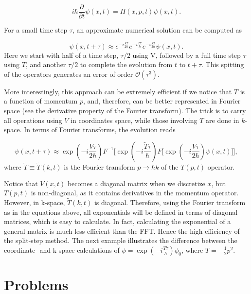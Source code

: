 \begin{equation}
 i\hbar \dfrac{\partial}{\partial t} \psi(x,t) = H(x,p,t)\psi(x,t). 
\end{equation}

For a small time step $\tau$, an approximate numerical solution can be computed as

\begin{equation}
 \psi(x, t+\tau) \approx e^{-i\frac{V\tau}{2\hbar}}  e^{-i\frac{T\tau}{\hbar}}  e^{-i\frac{V\tau}{2\hbar}}\psi(x,t).
\end{equation}
Here we start with half of a time step, $\tau/2$ using V, followed by a full time step $\tau$ using $T$, and another $\tau/2$ to complete the evolution from $t$ to $t+\tau$. This spitting of the operators generates an error of order $\mathcal{O}(\tau^3)$.

More interestingly, this approach can be extremely efficient if we notice that $T$ is a function of momentum $p$, and, therefore, can be better represented in Fourier space (see the derivative property of the Fourier transform). The trick is to carry all operations using $V$ in coordinates space, while those involving $T$ are done in $k$-space. In terms of Fourier transforms, the evolution reads

\begin{equation}
 \psi(x, t+\tau) \approx \exp\left(-i\dfrac{V\tau}{2\hbar}\right) F^{-1}\Big[ \exp\left(-i\dfrac{\tilde{T}\tau}{\hbar}\right)  F\Big[\exp\left(-i\dfrac{V\tau}{2\hbar}\right)  \psi(x,t)\Big]\Big],
\end{equation}
where $\tilde{T} \equiv \tilde{T}(k,t)$ is the Fourier transform $p \rightarrow \hbar k$ of the $T(p,t)$ operator.

Notice that $V(x,t)$ becomes a diagonal matrix when we discretize $x$, but $T(p,t)$ is non-diagonal, as it contains derivatives in the momentum operator. However, in k-space, $\tilde{T}(k,t)$ is diagonal. Therefore, using the Fourier transform as in the equations above, all exponentials will be defined in terms of diagonal matrices, which is easy to calculate. In fact, calculating the exponential of a general matrix is much less efficient than the FFT. Hence the high efficiency of the split-step method. The next example illustrates the difference between the coordinate- and k-space calculations of $\phi = \exp\left(-i\frac{T\tau}{\hbar}\right)\phi_0$, where $T = -\frac{1}{2}p^2$.



\section{Problems}

